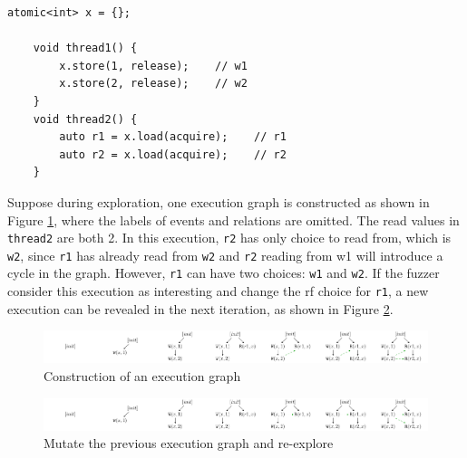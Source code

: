 \begin{lstlisting}[caption={Fuzzing example}, label={exp-fuzz}]
    atomic<int> x = {};
    
    void thread1() {
        x.store(1, release);    // w1
        x.store(2, release);    // w2
    }
    void thread2() {
        auto r1 = x.load(acquire);    // r1
        auto r2 = x.load(acquire);    // r2
    }
    \end{lstlisting}



Suppose during exploration, one execution graph is constructed as shown in Figure \ref{example_construct}, where the labels of events and relations are omitted. The read values in \texttt{thread2} are both 2. In this execution, \texttt{r2} has only choice to read from, which is \texttt{w2}, since \texttt{r1} has already read from \texttt{w2} and \texttt{r2} reading from w1 will introduce a cycle in the graph. However, \texttt{r1} can have two choices: \texttt{w1} and \texttt{w2}. If the fuzzer consider this execution as interesting and change the rf choice for \texttt{r1}, a new execution can be revealed in the next iteration, as shown in Figure \ref{example_mutate}. 

\begin{figure}[htbp] 
    \centering
    \includegraphics[scale=0.5]{figure/exec-graph/example_construct.pdf} 
    \caption{Construction of an execution graph} 
    \label{example_construct} 
\end{figure}

\begin{figure}[htbp] 
    \centering
    \includegraphics[scale=0.5]{figure/exec-graph//example_mutate.pdf} 
    \caption{Mutate the previous execution graph and re-explore} 
    \label{example_mutate} 
\end{figure}



